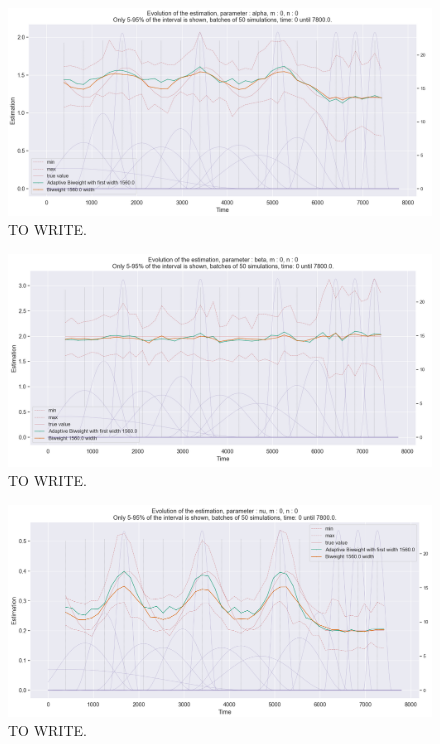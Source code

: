 \begin{figure}
\centering
\includegraphics[width = 0.90 \textwidth]{../imag/chap3/4/M.png}
\caption{TO WRITE.}
\label{fig:first_estimate_4_alpha}
\end{figure}

\begin{figure}
\centering
\includegraphics[width = 0.90 \textwidth]{../imag/chap3/4/N.png}
\caption{TO WRITE.}
\label{fig:first_estimate_4_beta}
\end{figure}

\begin{figure}
\centering
\includegraphics[width = 0.90 \textwidth]{../imag/chap3/4/O.png}
\caption{TO WRITE.}
\label{fig:first_estimate_4_nu}
\end{figure}









